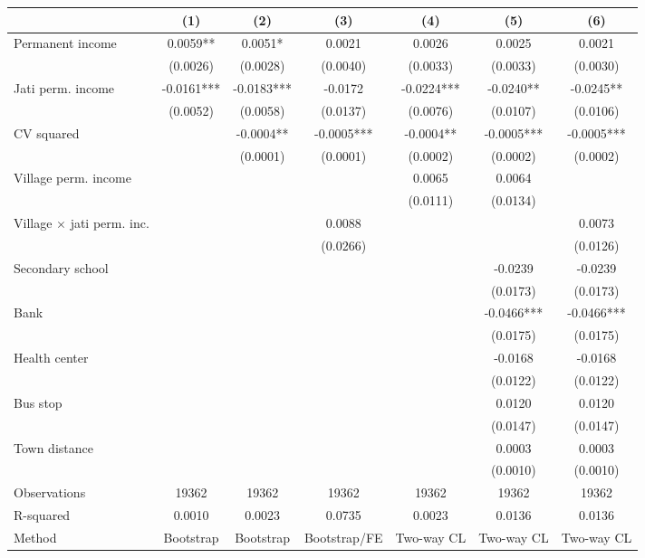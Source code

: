 \begin{adjustbox}{max width=\textwidth}
\begin{tabular}{lcccccc}
\toprule
 & (1) & (2) & (3) & (4) & (5) & (6) \\
\midrule
Permanent income & 0.0059** & 0.0051* & 0.0021 & 0.0026 & 0.0025 & 0.0021 \\
 & (0.0026) & (0.0028) & (0.0040) & (0.0033) & (0.0033) & (0.0030) \\
Jati perm. income & -0.0161*** & -0.0183*** & -0.0172 & -0.0224*** & -0.0240** & -0.0245** \\
 & (0.0052) & (0.0058) & (0.0137) & (0.0076) & (0.0107) & (0.0106) \\
CV squared &  & -0.0004** & -0.0005*** & -0.0004** & -0.0005*** & -0.0005*** \\
 &  & (0.0001) & (0.0001) & (0.0002) & (0.0002) & (0.0002) \\
Village perm. income &  &  &  & 0.0065 & 0.0064 &  \\
 &  &  &  & (0.0111) & (0.0134) &  \\
Village $\times$ jati perm. inc. &  &  & 0.0088 &  &  & 0.0073 \\
 &  &  & (0.0266) &  &  & (0.0126) \\
Secondary school &  &  &  &  & -0.0239 & -0.0239 \\
 &  &  &  &  & (0.0173) & (0.0173) \\
Bank &  &  &  &  & -0.0466*** & -0.0466*** \\
 &  &  &  &  & (0.0175) & (0.0175) \\
Health center &  &  &  &  & -0.0168 & -0.0168 \\
 &  &  &  &  & (0.0122) & (0.0122) \\
Bus stop &  &  &  &  & 0.0120 & 0.0120 \\
 &  &  &  &  & (0.0147) & (0.0147) \\
Town distance &  &  &  &  & 0.0003 & 0.0003 \\
 &  &  &  &  & (0.0010) & (0.0010) \\
\midrule
Observations & 19362 & 19362 & 19362 & 19362 & 19362 & 19362 \\
R-squared & 0.0010 & 0.0023 & 0.0735 & 0.0023 & 0.0136 & 0.0136 \\
Method & Bootstrap & Bootstrap & Bootstrap/FE & Two-way CL & Two-way CL & Two-way CL \\
\bottomrule
\end{tabular}
\end{adjustbox}
